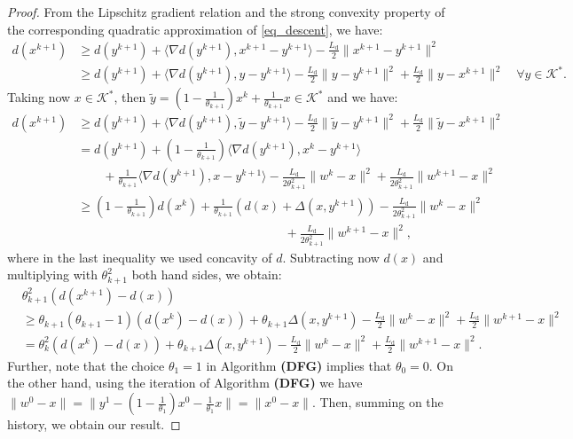 \documentclass{gOMS2e}
\theoremstyle{plain}
\theoremstyle{definition}
\theoremstyle{remark}
\providecommand{\norm}[1]{\lVert#1\rVert}
\begin{document}
\begin{proof} From the Lipschitz gradient relation and the strong convexity
property of the corresponding quadratic approximation of
\eqref{eq_descent}, we have:
\begin{align*}
d(x^{k+1}) &\ge d(y^{k+1}) + \langle \nabla d(y^{k+1}), x^{k+1}-y^{k+1} \rangle - \frac{L_\text{d}}{2}\norm{x^{k+1}-y^{k+1}}^2\\
& \ge d(y^{k+1}) + \langle \nabla d(y^{k+1}), y-y^{k+1}\rangle -
\frac{L_\text{d}}{2}\norm{y-y^{k+1}}^2
 + \frac{L_\text{d}}{2}\norm{y-x^{k+1}}^2  \quad \forall y \in {\mathcal{K}}^*.
\end{align*}
 Taking now $x \in {\mathcal{K}}^*$, then $\tilde{y} =
\left(1-\frac{1}{\theta_{k+1}}\right)x^k + \frac{1}{\theta_{k+1}}x
\in {\mathcal{K}}^*$ and we have:
\begin{align*}
 d(x^{k+1}) & \ge d(y^{k+1}) + \langle \nabla d(y^{k+1}), \tilde{y}-y^{k+1}\rangle - \frac{L_\text{d}}{2}\norm{\tilde{y} - y^{k+1}}^2 + \frac{L_\text{d}}{2}\norm{\tilde{y} - x^{k+1}}^2\\
& = d(y^{k+1}) + \left(1-\frac{1}{\theta_{k+1}}\right)\langle \nabla d(y^{k+1}), x^k - y^{k+1}\rangle \\
& \qquad \!+\! \frac{1}{\theta_{k+1}}\langle \nabla d(y^{k+1}\!), x -
y^{k+1}\rangle \!-
\frac{L_\text{d}}{2\theta_{k+1}^2}\norm{w^k \!- x}^2 \!+ \frac{L_\text{d}}{2\theta_{k+1}^2}\norm{w^{k+1} \!- x}^2 \\
& \ge \left(1- \frac{1}{\theta_{k+1}}\right) d(x^k) +
\frac{1}{\theta_{k+1}}(d(x) + \Delta(x,y^{k+1}))
 - \frac{L_\text{d}}{2\theta_{k+1}^2}\norm{w^k - x}^2 \\
& \hspace{7cm} + \frac{L_\text{d}}{2\theta_{k+1}^2}\norm{w^{k+1} -
x}^2,
\end{align*}
where in the last inequality we used concavity of $d$. Subtracting
now $d(x)$ and multiplying with $\theta_{k+1}^2$ both hand sides, we
obtain:
\begin{align*}
& \theta_{k+1}^2(d(x^{k+1}) - d(x))\\
& \ge \theta_{k+1}(\theta_{k+1} \!-\! 1)(d(x^k) - d(x))\! +\!
\theta_{k+1}\Delta(x, y^{k+1})
\!-\! \frac{L_\text{d}}{2}\norm{w^k \!\!- x}^2 \!+\! \frac{L_\text{d}}{2}\norm{w^{k+1} \!\!- x}^2\\
& =\theta_k^2 (d(x^k) - d(x)) + \theta_{k+1}\Delta(x, y^{k+1}) -
\frac{L_\text{d}}{2}\norm{w^k-x}^2 +
\frac{L_\text{d}}{2}\norm{w^{k+1}-x}^2.
\end{align*}
Further, note that the choice $\theta_1=1$ in Algorithm {\bf (DFG)}
implies that $\theta_0=0$. On the other hand, using the iteration of
Algorithm {\bf (DFG)} we have $\norm{w^0 - x} = \norm{y^1 -
\left(1-\frac{1}{\theta_1}\right)x^0 - \frac{1}{\theta_1}x} =
\norm{x^0 -x}$. Then, summing on the history, we obtain our result.
\end{proof}
\end{document}
